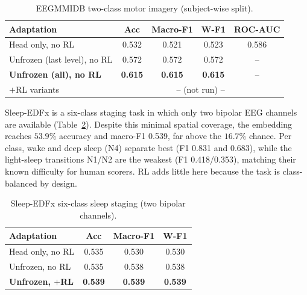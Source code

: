 \documentclass[journal]{IEEEtran}
\newcommand{\best}[1]{\textbf{#1}}
\begin{document}
\begin{table}[t]
\centering
\caption{EEGMMIDB two-class motor imagery (subject-wise split).}
\label{tab:mmidb}
\scriptsize
\setlength{\tabcolsep}{3pt}
\begin{tabular}{@{}lcccc@{}}
\toprule
Adaptation & Acc & Macro-F1 & W-F1 & ROC-AUC \\
\midrule
Head only, no RL                & 0.532 & 0.521 & 0.523 & 0.586 \\
Unfrozen (last level), no RL    & 0.572 & 0.572 & 0.572 & -- \\
\textbf{Unfrozen (all), no RL}  & \best{0.615} & \best{0.615} & \best{0.615} & -- \\
$+$RL variants                  & \multicolumn{4}{c}{-- (not run) --} \\
\bottomrule
\end{tabular}
\end{table}

Sleep-EDFx is a six-class staging task in which only two bipolar EEG channels are
available (Table~\ref{tab:sleep}). Despite this minimal spatial coverage, the
embedding reaches $53.9\%$ accuracy and macro-F1 \num{0.539}, far above the
$16.7\%$ chance. Per class, wake and deep sleep (N4) separate best (F1
\num{0.831} and \num{0.683}), while the light-sleep transitions N1/N2 are the
weakest (F1 \num{0.418}/\num{0.353}), matching their known difficulty for human
scorers. RL adds little here because the task is class-balanced by design.

\begin{table}[t]
\centering
\caption{Sleep-EDFx six-class sleep staging (two bipolar channels).}
\label{tab:sleep}
\small
\begin{tabular}{@{}lccc@{}}
\toprule
Adaptation & Acc & Macro-F1 & W-F1 \\
\midrule
Head only, no RL          & 0.535 & 0.530 & 0.530 \\
Unfrozen, no RL           & 0.535 & 0.538 & 0.538 \\
\textbf{Unfrozen, $+$RL}  & \best{0.539} & \best{0.539} & \best{0.539} \\
\bottomrule
\end{tabular}
\end{table}
\end{document}

